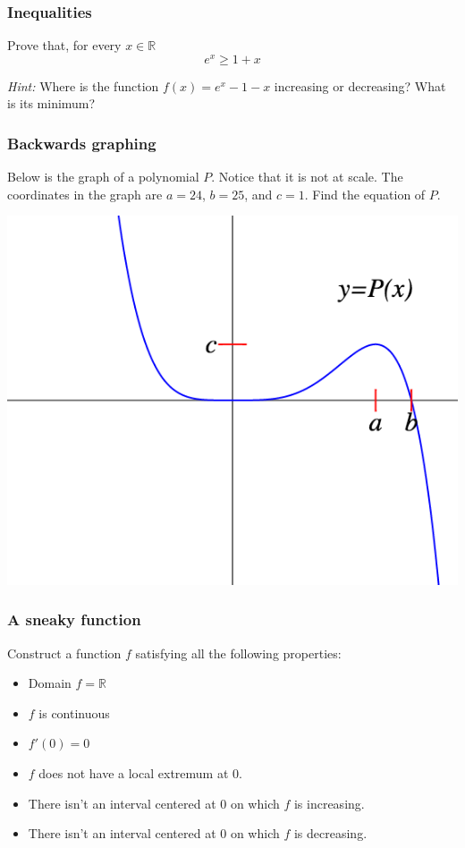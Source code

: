 \begin{frame}[t]
	\frametitle{Inequalities}

	Prove that, for every $x \in \mathbb{R}$
	\[
		e^{x}\geq 1 + x
	\]

	\emph{Hint:} Where is the function $\displaystyle f(x) =e^{x}- 1-x$ increasing
	or decreasing? What is its minimum?
\end{frame}

\begin{frame}[t]
	\frametitle{Backwards graphing}

	Below is the graph of a polynomial $P$. Notice that it is not at scale. The
	coordinates in the graph are $a=24$, $b=25$, and $c=1$. Find the equation of $P$.

	\begin{center}
		\includegraphics[scale=.38]{G18}
	\end{center}
\end{frame}

\begin{frame}[t]
	\frametitle{A sneaky function}

	Construct a function $f$ satisfying all the following properties:

	\begin{itemize}
		\item Domain $\displaystyle f = \mathbb{R}$

		\item $f$ is continuous

		\item $f'(0)=0$

		\item $f$ does not have a local extremum at $0$.

		\item There isn't an interval centered at $0$ on which $f$ is increasing.

		\item There isn't an interval centered at $0$ on which $f$ is decreasing.
	\end{itemize}
\end{frame}

